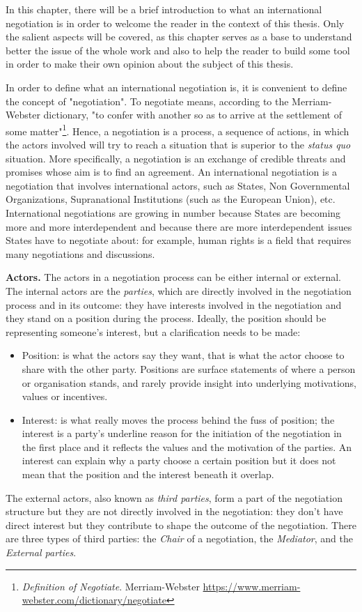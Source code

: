 \documentclass[../main.tex]{subfiles}
\begin{document}
\label{chap:2}

In this chapter, there will be a brief introduction to what an international negotiation is in order to welcome the reader in the context of this thesis. Only the salient aspects will be covered, as this chapter serves as a base to understand better the issue of the whole work and also to help the reader to build some tool in order to make their own opinion about the subject of this thesis.

In order to define what an international negotiation is, it is convenient to define the concept of "negotiation". To negotiate means, according to the Merriam-Webster dictionary, "to confer with another so as to arrive at the settlement of some matter"\footnote{\textit{Definition of Negotiate}. Merriam-Webster \url{https://www.merriam-webster.com/dictionary/negotiate}}. Hence, a negotiation is a process, a sequence of actions, in which the actors involved will try to reach a situation that is superior to the \textit{status quo} situation. More specifically, a negotiation is an exchange of credible threats and promises whose aim is to find an agreement. An international negotiation is a negotiation that involves international actors, such as States, Non Governmental Organizations, Supranational Institutions (such as the European Union), etc. International negotiations are growing in number because States are becoming more and more interdependent and because there are more interdependent issues States have to negotiate about: for example, human rights is a field that requires many negotiations and discussions.

\textbf{Actors.} The actors in a negotiation process can be either internal or external. The internal actors are the \textit{parties}, which are directly involved in the negotiation process and in its outcome: they have interests involved in the negotiation and they stand on a position during the process. Ideally, the position should be representing someone's interest, but a clarification needs to be made:
\begin{itemize}
\item Position: is what the actors say they want, that is what the actor choose to share with the other party. Positions are surface statements of where a person or organisation stands, and rarely provide insight into underlying motivations, values or incentives\autocite[]{watershed}.
\item Interest: is what really moves the process behind the fuss of position; the interest is a party's underline reason for the initiation of the negotiation in the first place and it reflects the values and the motivation of the parties. An interest can explain why a party choose a certain position but it does not mean that the position and the interest beneath it overlap.
\end{itemize}
The external actors, also known as \textit{third parties}, form a part of the negotiation structure but they are not directly involved in the negotiation: they don't have direct interest but they contribute to shape the outcome of the negotiation. There are three types of third parties: the \textit{Chair} of a negotiation, the \textit{Mediator}, and the \textit{External parties}.
\end{document}
